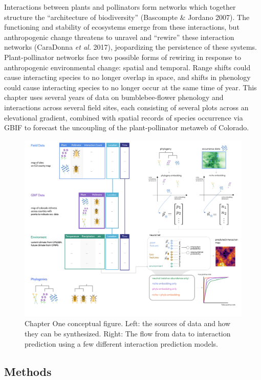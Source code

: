\documentclass[11pt]{article}
\makeatletter
\def\maxwidth{\ifdim\Gin@nat@width>\linewidth\linewidth
\else\Gin@nat@width\fi}
\let\Oldincludegraphics\includegraphics
\renewcommand{\includegraphics}[1]{\Oldincludegraphics[width=\maxwidth]{#1}}
\makeatother
\begin{document}
Interactions between plants and pollinators form networks which together
structure the ``architecture of biodiversity'' (Bascompte \& Jordano
2007). The functioning and stability of ecosystems emerge from these
interactions, but anthropogenic change threatens to unravel and
``rewire'' these interaction networks (CaraDonna \emph{et al.} 2017),
jeopardizing the persistence of these systems. Plant-pollinator networks
face two possible forms of rewiring in response to anthropogenic
environmental change: spatial and temporal. Range shifts could cause
interacting species to no longer overlap in space, and shifts in
phenology could cause interacting species to no longer occur at the same
time of year. This chapter uses several years of data on
bumblebee-flower phenology and interactions across several field sites,
each consisting of several plots across an elevational gradient,
combined with spatial records of species occurrence via GBIF to forecast
the uncoupling of the plant-pollinator metaweb of Colorado.

\begin{figure}
\centering
\includegraphics{./figures/ch1.png}
\caption{Chapter One conceptual figure. Left: the sources of data and
how they can be synthesized. Right: The flow from data to interaction
prediction using a few different interaction prediction models.}
\end{figure}

\hypertarget{methods-1}{%
\subsection{Methods}\label{methods-1}}
\end{document}
